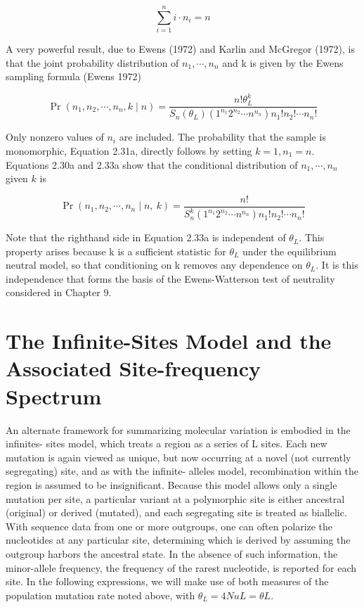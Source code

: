 \documentclass{article}
\begin{document}
\begin{equation}
\sum_{i=1}^{n}i\cdot n_{i}=n
\tag{2.32}
\label{eq:2_32}
\end{equation}

A very powerful result, due to Ewens (1972) and Karlin and McGregor (1972), is that the joint probability distribution of  $ n_{1}, \cdots, n_{n} $ and k is given by the Ewens sampling formula (Ewens 1972)

\begin{equation}
\Pr(n_{1},n_{2},\cdots,n_{n},k\mid n)=\frac{n!\theta_{L}^{k}}{S_{n}(\theta_{L})\left(1^{n_{1}}2^{n_{2}}\cdots n^{n_{n}}\right)n_{1}!n_{2}!\cdots n_{n}!}
\tag{2.33a}
\label{eq:2_33a}
\end{equation}

Only nonzero values of  $ n_i $ are included. The probability that the sample is monomorphic, Equation 2.31a, directly follows by setting  $ k = 1, n_1 = n $. Equations 2.30a and 2.33a show that the conditional distribution of  $ n_1, \cdots, n_n $ given  $ k $ is

\begin{equation}
\Pr(n_{1},n_{2},\cdots,n_{n}\mid n,\ k)=\frac{n!}{S_{n}^{k}\left(1^{n_{1}}2^{n_{2}}\cdots n^{n_{n}}\right)n_{1}!n_{2}!\cdots n_{n}!}
\tag{2.33b}
\label{eq:2_33b}
\end{equation}

Note that the righthand side in Equation 2.33a is independent of  $ \theta_{L} $. This property arises because k is a sufficient statistic for  $ \theta_{L} $ under the equilibrium neutral model, so that conditioning on k removes any dependence on  $ \theta_{L} $. It is this independence that forms the basis of the Ewens-Watterson test of neutrality considered in Chapter 9.

\section{The Infinite-Sites Model and the Associated Site-frequency Spectrum}
An alternate framework for summarizing molecular variation is embodied in the infinites-
sites model, which treats a region as a series of L sites. Each new mutation is again viewed as
unique, but now occurring at a novel (not currently segregating) site, and as with the infinite-
alleles model, recombination within the region is assumed to be insignificant. Because
this model allows only a single mutation per site, a particular variant at a polymorphic
site is either ancestral (original) or derived (mutated), and each segregating site is treated
as biallelic. With sequence data from one or more outgroups, one can often polarize the
nucleotides at any particular site, determining which is derived by assuming the outgroup
harbors the ancestral state. In the absence of such information, the minor-allele frequency,
the frequency of the rarest nucleotide, is reported for each site. In the following expressions,
we will make use of both measures of the population mutation rate noted above, with
 $ \theta_L = 4NuL = \theta L $.
\end{document}
